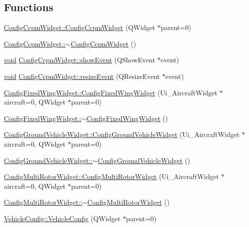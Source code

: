 \subsection*{\-Functions}
\begin{DoxyCompactItemize}
\item 
\hyperlink{group___config_plugin_gad02f1999c6fe879b07303698416ff782}{\-Config\-Ccpm\-Widget\-::\-Config\-Ccpm\-Widget} (\-Q\-Widget $\ast$parent=0)
\item 
\hyperlink{group___config_plugin_ga1c115c3e78572da9895bc485b6ed507e}{\-Config\-Ccpm\-Widget\-::$\sim$\-Config\-Ccpm\-Widget} ()
\item 
\hyperlink{group___u_a_v_objects_plugin_ga444cf2ff3f0ecbe028adce838d373f5c}{void} \hyperlink{group___config_plugin_ga400903af96a9e0b31101d06356f267fe}{\-Config\-Ccpm\-Widget\-::show\-Event} (\-Q\-Show\-Event $\ast$event)
\item 
\hyperlink{group___u_a_v_objects_plugin_ga444cf2ff3f0ecbe028adce838d373f5c}{void} \hyperlink{group___config_plugin_gaa76c187cd732f13b15ee909af137487f}{\-Config\-Ccpm\-Widget\-::resize\-Event} (\-Q\-Resize\-Event $\ast$event)
\item 
\hyperlink{group___config_plugin_gaee3501121903de9f9860f69611fd07e6}{\-Config\-Fixed\-Wing\-Widget\-::\-Config\-Fixed\-Wing\-Widget} (\-Ui\-\_\-\-Aircraft\-Widget $\ast$aircraft=0, \-Q\-Widget $\ast$parent=0)
\item 
\hyperlink{group___config_plugin_ga9f0af233f9470bbaab33d70b96644cef}{\-Config\-Fixed\-Wing\-Widget\-::$\sim$\-Config\-Fixed\-Wing\-Widget} ()
\item 
\hyperlink{group___config_plugin_ga7d15969655ebd8ccde81977fd63cc516}{\-Config\-Ground\-Vehicle\-Widget\-::\-Config\-Ground\-Vehicle\-Widget} (\-Ui\-\_\-\-Aircraft\-Widget $\ast$aircraft=0, \-Q\-Widget $\ast$parent=0)
\item 
\hyperlink{group___config_plugin_ga9104e5fbab423b4e0f0b1f7bc92b4a87}{\-Config\-Ground\-Vehicle\-Widget\-::$\sim$\-Config\-Ground\-Vehicle\-Widget} ()
\item 
\hyperlink{group___config_plugin_ga1f8b823890ddd40ac391df9aa59cfd79}{\-Config\-Multi\-Rotor\-Widget\-::\-Config\-Multi\-Rotor\-Widget} (\-Ui\-\_\-\-Aircraft\-Widget $\ast$aircraft=0, \-Q\-Widget $\ast$parent=0)
\item 
\hyperlink{group___config_plugin_gac8ee6c628cb4f8f195395978f8f086bb}{\-Config\-Multi\-Rotor\-Widget\-::$\sim$\-Config\-Multi\-Rotor\-Widget} ()
\item 
\hyperlink{group___config_plugin_ga369dba1a2bcda89963b25078cbf89fd9}{\-Vehicle\-Config\-::\-Vehicle\-Config} (\-Q\-Widget $\ast$parent=0)

\end{DoxyCompactItemize}
